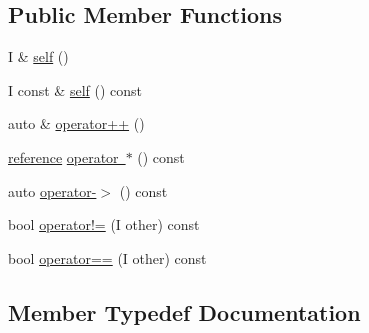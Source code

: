 \subsection*{Public Member Functions}
\begin{DoxyCompactItemize}
\item 
I \& \mbox{\hyperlink{structrah_1_1iterator__facade_3_01_i_00_01_r_00_01std_01_1_1forward__iterator__tag_01_4_a33b9b1880a99615f59a9c9ab653b083e}{self}} ()
\item 
I const  \& \mbox{\hyperlink{structrah_1_1iterator__facade_3_01_i_00_01_r_00_01std_01_1_1forward__iterator__tag_01_4_addc54ad790aa07a1467e3e4a50d60864}{self}} () const
\item 
auto \& \mbox{\hyperlink{structrah_1_1iterator__facade_3_01_i_00_01_r_00_01std_01_1_1forward__iterator__tag_01_4_a7b4c5ce92d8f683e63d1fce16c1acd13}{operator++}} ()
\item 
\mbox{\hyperlink{structrah_1_1iterator__facade_3_01_i_00_01_r_00_01std_01_1_1forward__iterator__tag_01_4_afc82a925c7d3fa3959bc9e8fc96dc582}{reference}} \mbox{\hyperlink{structrah_1_1iterator__facade_3_01_i_00_01_r_00_01std_01_1_1forward__iterator__tag_01_4_afa0ea1baac6413bf9ef210515e0bf14b}{operator $\ast$}} () const
\item 
auto \mbox{\hyperlink{structrah_1_1iterator__facade_3_01_i_00_01_r_00_01std_01_1_1forward__iterator__tag_01_4_a3475cf08817d983a6ca49694e08ce600}{operator-\/$>$}} () const
\item 
bool \mbox{\hyperlink{structrah_1_1iterator__facade_3_01_i_00_01_r_00_01std_01_1_1forward__iterator__tag_01_4_a57054448d43f42e55f56d57d4fcf6ca1}{operator!=}} (I other) const
\item 
bool \mbox{\hyperlink{structrah_1_1iterator__facade_3_01_i_00_01_r_00_01std_01_1_1forward__iterator__tag_01_4_a6fd9be033e6914adcca8da044606eff2}{operator==}} (I other) const
\end{DoxyCompactItemize}


\subsection{Member Typedef Documentation}
\mbox{\label{structrah_1_1iterator__facade_3_01_i_00_01_r_00_01std_01_1_1forward__iterator__tag_01_4_abc2f97747157d90d76075b0df9a236f0}} 
